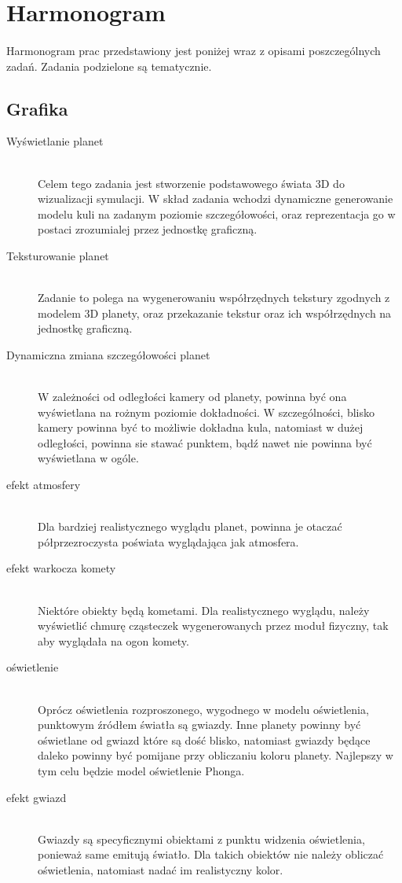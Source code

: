 \section{Harmonogram}\label{sec:harmonogram}

\paragraph{}

Harmonogram prac przedstawiony jest poniżej wraz z opisami poszczególnych zadań. Zadania podzielone są tematycznie.

\subsection{Grafika}

\begin{description}
	\item[Wyświetlanie planet] \hfill \\
	Celem tego zadania jest stworzenie podstawowego świata 3D do wizualizacji symulacji. W skład zadania wchodzi dynamiczne generowanie modelu kuli na zadanym poziomie szczegółowości, oraz reprezentacja go w postaci zrozumialej przez jednostkę graficzną.
	\item[Teksturowanie planet] \hfill \\
	Zadanie to polega na wygenerowaniu współrzędnych tekstury zgodnych z modelem 3D planety, oraz przekazanie tekstur oraz ich współrzędnych na jednostkę graficzną.
	\item[Dynamiczna zmiana szczegółowości planet] \hfill \\
	W zależności od odległości kamery od planety, powinna być ona wyświetlana na rożnym poziomie dokładności. W szczególności, blisko kamery powinna być to możliwie dokładna kula, natomiast w dużej odległości, powinna sie stawać punktem, bądź nawet nie powinna być wyświetlana w ogóle.
	\item[efekt atmosfery] \hfill \\
	Dla bardziej realistycznego wyglądu planet, powinna je otaczać półprzezroczysta poświata wyglądająca jak atmosfera.
	\item[efekt warkocza komety] \hfill \\
	Niektóre obiekty będą kometami. Dla realistycznego wyglądu, należy wyświetlić chmurę cząsteczek wygenerowanych przez moduł fizyczny, tak aby wyglądała na ogon komety.
	\item[oświetlenie] \hfill \\
	Oprócz oświetlenia rozproszonego, wygodnego w modelu oświetlenia, punktowym źródłem światła są gwiazdy. Inne planety powinny być oświetlane od gwiazd które są dość blisko, natomiast gwiazdy będące daleko powinny być pomijane przy obliczaniu koloru planety. Najlepszy w tym celu będzie model oświetlenie Phonga.
	\item[efekt gwiazd] \hfill \\
	Gwiazdy są specyficznymi obiektami z punktu widzenia oświetlenia, ponieważ same emitują światło. Dla takich obiektów nie należy obliczać oświetlenia, natomiast nadać im realistyczny kolor.
\end{description}

